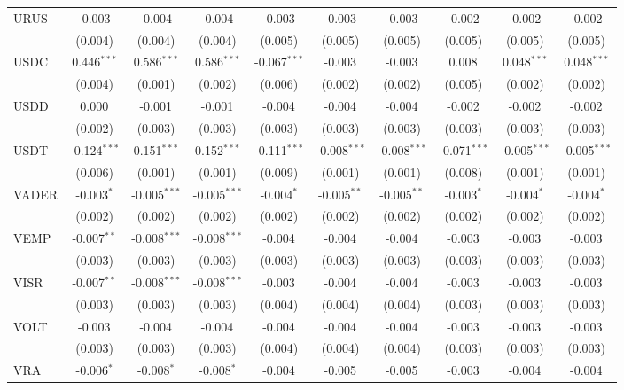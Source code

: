 \begin{table}[!htbp]
\begin{tabular}{@{\extracolsep{5pt}}lccccccccc}
 URUS & -0.003$^{}$ & -0.004$^{}$ & -0.004$^{}$ & -0.003$^{}$ & -0.003$^{}$ & -0.003$^{}$ & -0.002$^{}$ & -0.002$^{}$ & -0.002$^{}$ \\
  & (0.004) & (0.004) & (0.004) & (0.005) & (0.005) & (0.005) & (0.005) & (0.005) & (0.005) \\
 USDC & 0.446$^{***}$ & 0.586$^{***}$ & 0.586$^{***}$ & -0.067$^{***}$ & -0.003$^{}$ & -0.003$^{}$ & 0.008$^{}$ & 0.048$^{***}$ & 0.048$^{***}$ \\
  & (0.004) & (0.001) & (0.002) & (0.006) & (0.002) & (0.002) & (0.005) & (0.002) & (0.002) \\
 USDD & 0.000$^{}$ & -0.001$^{}$ & -0.001$^{}$ & -0.004$^{}$ & -0.004$^{}$ & -0.004$^{}$ & -0.002$^{}$ & -0.002$^{}$ & -0.002$^{}$ \\
  & (0.002) & (0.003) & (0.003) & (0.003) & (0.003) & (0.003) & (0.003) & (0.003) & (0.003) \\
 USDT & -0.124$^{***}$ & 0.151$^{***}$ & 0.152$^{***}$ & -0.111$^{***}$ & -0.008$^{***}$ & -0.008$^{***}$ & -0.071$^{***}$ & -0.005$^{***}$ & -0.005$^{***}$ \\
  & (0.006) & (0.001) & (0.001) & (0.009) & (0.001) & (0.001) & (0.008) & (0.001) & (0.001) \\
 VADER & -0.003$^{*}$ & -0.005$^{***}$ & -0.005$^{***}$ & -0.004$^{*}$ & -0.005$^{**}$ & -0.005$^{**}$ & -0.003$^{*}$ & -0.004$^{*}$ & -0.004$^{*}$ \\
  & (0.002) & (0.002) & (0.002) & (0.002) & (0.002) & (0.002) & (0.002) & (0.002) & (0.002) \\
 VEMP & -0.007$^{**}$ & -0.008$^{***}$ & -0.008$^{***}$ & -0.004$^{}$ & -0.004$^{}$ & -0.004$^{}$ & -0.003$^{}$ & -0.003$^{}$ & -0.003$^{}$ \\
  & (0.003) & (0.003) & (0.003) & (0.003) & (0.003) & (0.003) & (0.003) & (0.003) & (0.003) \\
 VISR & -0.007$^{**}$ & -0.008$^{***}$ & -0.008$^{***}$ & -0.003$^{}$ & -0.004$^{}$ & -0.004$^{}$ & -0.003$^{}$ & -0.003$^{}$ & -0.003$^{}$ \\
  & (0.003) & (0.003) & (0.003) & (0.004) & (0.004) & (0.004) & (0.003) & (0.003) & (0.003) \\
 VOLT & -0.003$^{}$ & -0.004$^{}$ & -0.004$^{}$ & -0.004$^{}$ & -0.004$^{}$ & -0.004$^{}$ & -0.003$^{}$ & -0.003$^{}$ & -0.003$^{}$ \\
  & (0.003) & (0.003) & (0.003) & (0.004) & (0.004) & (0.004) & (0.003) & (0.003) & (0.003) \\
 VRA & -0.006$^{*}$ & -0.008$^{*}$ & -0.008$^{*}$ & -0.004$^{}$ & -0.005$^{}$ & -0.005$^{}$ & -0.003$^{}$ & -0.004$^{}$ & -0.004$^{}$ \\

\end{tabular}
\end{table}
